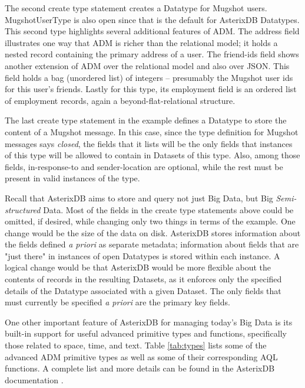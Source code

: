 The second create type statement creates a Datatype for Mugshot users.
MugshotUserType is also open since that is the default for AsterixDB Datatypes.
This second type highlights several additional features of ADM.
The address field illustrates one way that ADM is richer than the relational model; it holds a nested record containing the primary address of a user.
The friend-ids field shows another extension of ADM over the relational model and also over JSON.
This field holds a bag (unordered list) of integers -- presumably the Mugshot user ids for this user's friends.
Lastly for this type, its employment field is an ordered list of employment records, again a beyond-flat-relational structure.

The last create type statement in the example defines a Datatype to store the content of a Mugshot message.
In this case, since the type definition for Mugshot messages says \emph{closed}, the fields that it lists will be the only fields that instances of this type will be allowed to contain in Datasets of this type.
Also, among those fields, in-response-to and sender-location are optional, while the rest must be present in valid instances of the type.

Recall that AsterixDB aims to store and query not just Big Data, but Big \emph{Semi-structured} Data. 
Most of the fields in the create type statements above could be omitted, if desired, while changing only two things in terms of the example.  
One change would be the size of the data on disk. 
AsterixDB stores information about the fields defined \emph{a priori} as separate metadata; information about fields that are "just there" in instances of open Datatypes is stored within each instance.
A logical change would be that AsterixDB would be more flexible about the contents of records in the resulting Datasets, as it enforces only the specified details of the Datatype associated with a given Dataset.
The only fields that must currently be specified \emph{a priori} are the primary key fields. 

One other important feature of AsterixDB for managing today's Big Data is its built-in support for useful advanced primitive types and functions, specifically those related to space, time, and text.
Table \ref{tab:types} lists some of the advanced ADM primitive types as well as some of their corresponding AQL functions.
A complete list and more details can be found in the AsterixDB documentation \cite{docs}.


